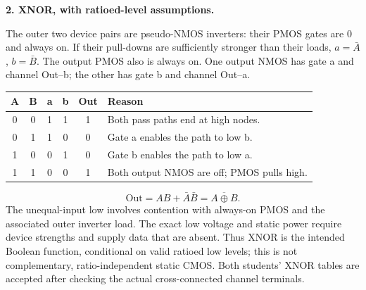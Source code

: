 \documentclass[10pt]{article}
\newcommand{\mos}[4]{\begin{scope}[shift={(#1,#2)}]
\draw (0,.24)--(0,-.24);\draw (0,.20)--(.25,.20)--(.25,.5);
\draw (0,-.20)--(.25,-.20)--(.25,-.5);\draw (-.16,.23)--(-.16,-.23);
\ifnum#4=1\draw (-.26,0) circle (.06);\draw (-.75,0)--(-.32,0);\else\draw (-.75,0)--(-.16,0);\fi
\node[anchor=east,font=\scriptsize] at (-.76,0) {$#3$};\end{scope}}
\newcommand{\ground}[2]{\draw (#1,#2)--(#1,{#2-.12});\draw ({#1-.17},{#2-.12})--({#1+.17},{#2-.12});\draw ({#1-.11},{#2-.20})--({#1+.11},{#2-.20});}
\newcommand{\rail}[3]{\draw (#1,#2)--(#1,{#2+.14});\node[above,font=\scriptsize] at (#1,{#2+.14}) {$#3$};}
\begin{document}
\textbf{2. XNOR, with ratioed-level assumptions.}
\begin{center}\end{center}
The outer two device pairs are pseudo-NMOS inverters: their PMOS gates are 0 and always on. If their pull-downs are sufficiently stronger than their loads, $a=\bar A$, $b=\bar B$. The output PMOS also is always on. One output NMOS has gate a and channel Out--b; the other has gate b and channel Out--a.
\begin{center}\begin{tabular}{cccccl}\toprule
A&B&a&b&Out&Reason\\\midrule
0&0&1&1&1&Both pass paths end at high nodes.\\
0&1&1&0&0&Gate a enables the path to low b.\\
1&0&0&1&0&Gate b enables the path to low a.\\
1&1&0&0&1&Both output NMOS are off; PMOS pulls high.\\\bottomrule\end{tabular}\end{center}
\[\boxed{\mathrm{Out}=AB+\bar A\bar B=\overline{A\oplus B}.}\]
The unequal-input low involves contention with always-on PMOS and the associated outer inverter load. The exact low voltage and static power require device strengths and supply data that are absent. Thus XNOR is the intended Boolean function, conditional on valid ratioed low levels; this is not complementary, ratio-independent static CMOS. Both students' XNOR tables are accepted after checking the actual cross-connected channel terminals.
\end{document}
